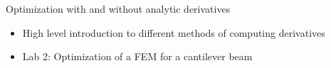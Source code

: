 \documentclass[aspectratio=169, usenames,dvipsnames, 14pt]{beamer}
\begin{document}
\begingroup
{}
\begin{frame}{Optimization with and without analytic derivatives}

    \begin{itemize}
        \item High level introduction to different methods of computing derivatives
        \vspace{0.5cm}
        \item Lab 2: Optimization of a FEM for a cantilever beam
    \end{itemize}
    
\end{frame}
\endgroup

\end{document}
